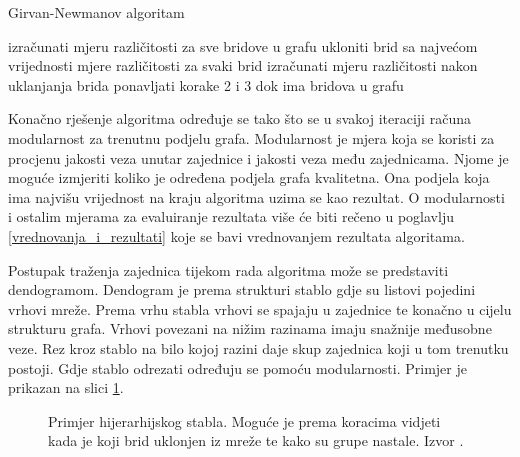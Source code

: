 \documentclass[times, utf8, diplomski]{fer}
\begin{document}
\bigskip
\begin{algorithm}
	\caption{Girvan-Newmanov algoritam}
	\begin{algorithmic}[1]
		\STATE izračunati mjeru različitosti za sve bridove u grafu
		\STATE ukloniti brid sa najvećom vrijednosti mjere različitosti
		\STATE za svaki brid izračunati mjeru različitosti nakon uklanjanja brida
		\STATE ponavljati korake 2 i 3 dok ima bridova u grafu
	\end{algorithmic}
\end{algorithm}
\bigskip

Konačno rješenje algoritma određuje se tako što se u svakoj iteraciji računa modularnost za trenutnu podjelu grafa. Modularnost je mjera koja se koristi za procjenu jakosti veza unutar zajednice i jakosti veza među zajednicama. Njome je moguće izmjeriti koliko je određena podjela grafa kvalitetna. Ona podjela koja ima najvišu vrijednost na kraju algoritma uzima se kao rezultat. O modularnosti i ostalim mjerama za evaluiranje rezultata više će biti rečeno u poglavlju \ref{vrednovanja_i_rezultati} koje se bavi vrednovanjem rezultata algoritama.


Postupak traženja zajednica tijekom rada algoritma može se predstaviti dendogramom. Dendogram je prema strukturi stablo gdje su listovi pojedini vrhovi mreže. Prema vrhu stabla vrhovi se spajaju u zajednice te konačno u cijelu strukturu grafa. Vrhovi povezani na nižim razinama imaju snažnije međusobne veze. Rez kroz stablo na bilo kojoj razini daje skup zajednica koji u tom trenutku postoji. Gdje stablo odrezati određuju se pomoću modularnosti. Primjer je prikazan na slici \ref{fig:dendogram}.

\begin{figure}
	\caption{Primjer hijerarhijskog stabla. Moguće je prema koracima vidjeti kada je koji brid uklonjen iz mreže te kako su grupe nastale. Izvor \cite{girvan2002community}.}
	\label{fig:dendogram}
\end{figure}
\end{document}
